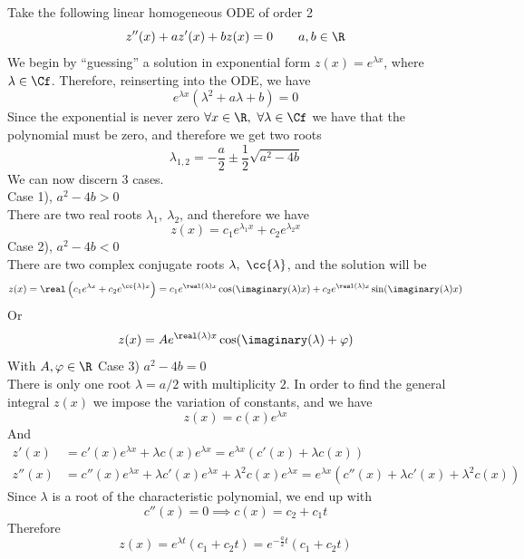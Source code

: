 \documentclass[../mmf.tex]{subfiles}
\begin{document}
\begin{mtd}
	Take the following linear homogeneous ODE of order 2
	\begin{equation*}
		z''(x)+az'(x)+bz(x)=0\qquad a,b\in\R
	\end{equation*}
	We begin by ``guessing'' a solution in exponential form $z(x)=e^{\lambda x}$, where $\lambda\in\Cf$. Therefore, reinserting into the ODE, we have
	\begin{equation*}
		e^{\lambda x}\left( \lambda^2+a\lambda+b \right)=0
	\end{equation*}
	Since the exponential is never zero $\forall x\in\R,\ \forall\lambda\in\Cf$ we have that the polynomial must be zero, and therefore we get two roots
	\begin{equation*}
		\lambda_{1,2}=-\frac{a}{2}\pm\frac{1}{2}\sqrt{a^2-4b}
	\end{equation*}
	We can now discern 3 cases.\\
	Case 1), $a^2-4b>0$\\
	There are two real roots $\lambda_1,\ \lambda_2$, and therefore we have
	\begin{equation*}
		z(x)=c_1e^{\lambda_1x}+c_2e^{\lambda_2x}
	\end{equation*}
	Case 2), $a^2-4b<0$\\
	There are two complex conjugate roots $\lambda,\ \cc{\lambda}$, and the solution will be
	\begin{equation*}
		z(x)=\real\left( c_1e^{\lambda x}+c_2e^{\cc{\lambda}x} \right)=c_1e^{\real(\lambda)x}\cos(\imaginary(\lambda)x)+c_2e^{\real(\lambda)x}\sin(\imaginary(\lambda)x)
	\end{equation*}
	Or
	\begin{equation*}
		z(x)=Ae^{\real(\lambda)x}\cos(\imaginary(\lambda)+\varphi)
	\end{equation*}
	With $A,\varphi\in\R$
	Case 3) $a^2-4b=0$\\
	There is only one root $\lambda=a/2$ with multiplicity $2$. In order to find the general integral $z(x)$ we impose the variation of constants, and we have
	\begin{equation*}
		z(x)=c(x)e^{\lambda x}
	\end{equation*}
	And
	\begin{equation*}
		\begin{aligned}
			z'(x)&=c'(x)e^{\lambda x}+\lambda c(x)e^{\lambda x}=e^{\lambda x}(c'(x)+\lambda c(x))\\
			z''(x)&=c''(x)e^{\lambda x}+\lambda c'(x)e^{\lambda x}+\lambda^2 c(x)e^{\lambda x}=e^{\lambda x}(c''(x)+\lambda c'(x)+\lambda^2c(x))
		\end{aligned}
	\end{equation*}
	Since $\lambda$ is a root of the characteristic polynomial, we end up with
	\begin{equation*}
		c''(x)=0\implies{} c(x)=c_2+c_1t
	\end{equation*}
	Therefore
	\begin{equation*}
		z(x)=e^{\lambda t}(c_1+c_2t)=e^{-\frac{a}{2}t}(c_1+c_2t)
	\end{equation*}
\end{mtd}
\end{document}
